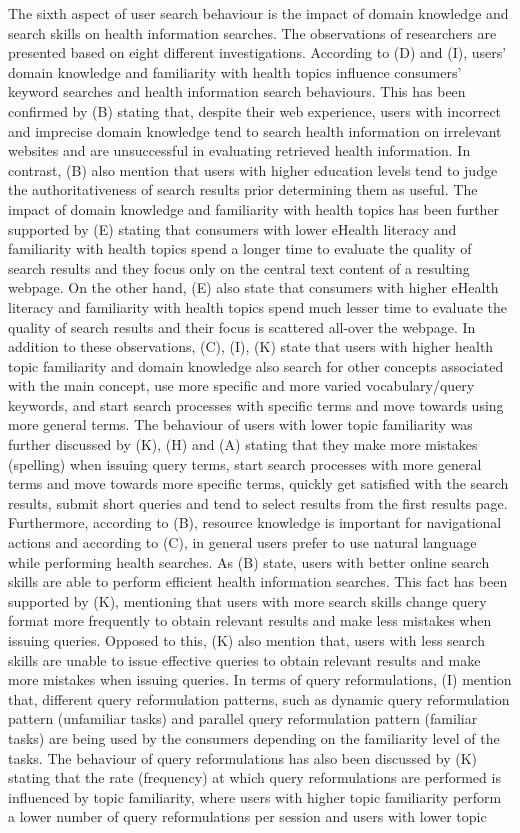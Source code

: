 \documentclass[]{article}
\begin{document}
The sixth aspect of user search behaviour is the impact of domain knowledge and search skills on health information searches. The observations of researchers are presented based on eight different investigations. According to (D) and (I), users’ domain knowledge and familiarity with health topics influence consumers' keyword searches and health information search behaviours. This has been confirmed by (B) stating that, despite their web experience, users with incorrect and imprecise domain knowledge tend to search health information on irrelevant websites and are unsuccessful in evaluating retrieved health information. In contrast, (B) also mention that users with higher education levels tend to judge the authoritativeness of search results prior determining them as useful. The impact of domain knowledge and familiarity with health topics has been further supported by (E) stating that consumers with lower eHealth literacy and familiarity with health topics spend a longer time to evaluate the quality of search results and they focus only on the central text content of a resulting webpage. On the other hand, (E) also state that consumers with higher eHealth literacy and  familiarity with health topics spend much lesser time to evaluate the quality of search results and their focus is scattered all-over the webpage. In addition to these observations, (C), (I), (K) state that users with higher health topic familiarity and domain knowledge also search for other concepts associated with the main concept, use more specific and more varied vocabulary/query keywords, and start search processes with specific terms and move towards using more general terms. The behaviour of users with lower topic familiarity was further discussed by (K), (H) and (A) stating that they make more mistakes (spelling) when issuing query terms, start search processes with more general terms and move towards more specific terms, quickly get satisfied with the search results, submit short queries and tend to select results from the first results page. Furthermore, according to (B), resource knowledge is important for navigational actions and according to (C), in general users prefer to use natural language while performing health searches. As (B) state, users with better online search skills are able to perform efficient health information searches. This fact has been supported by (K), mentioning that users with more search skills change query format more frequently to obtain relevant results and make less mistakes when issuing queries. Opposed to this, (K) also mention that, users with less search skills are unable to issue effective queries to obtain relevant results and make more mistakes when issuing queries. In terms of query reformulations, (I) mention that, different query reformulation patterns, such as dynamic query reformulation pattern (unfamiliar tasks) and parallel query reformulation pattern (familiar tasks) are being used by the consumers depending on the familiarity level of the tasks. The behaviour of query reformulations has also been discussed by (K) stating that the rate (frequency) at which query reformulations are performed is influenced by topic familiarity, where users with higher topic familiarity perform a lower number of query reformulations per session and users with lower topic 
\end{document}
